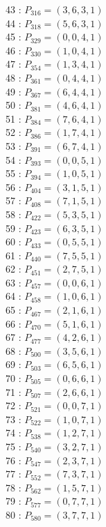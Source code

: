 \documentclass{article}
\begin{document}
{\begin{multicols}{3}
43 : $P_{316}=( 3, 6, 3, 1 )$\\
44 : $P_{318}=( 5, 6, 3, 1 )$\\
45 : $P_{329}=( 0, 0, 4, 1 )$\\
46 : $P_{330}=( 1, 0, 4, 1 )$\\
47 : $P_{354}=( 1, 3, 4, 1 )$\\
48 : $P_{361}=( 0, 4, 4, 1 )$\\
49 : $P_{367}=( 6, 4, 4, 1 )$\\
50 : $P_{381}=( 4, 6, 4, 1 )$\\
51 : $P_{384}=( 7, 6, 4, 1 )$\\
52 : $P_{386}=( 1, 7, 4, 1 )$\\
53 : $P_{391}=( 6, 7, 4, 1 )$\\
54 : $P_{393}=( 0, 0, 5, 1 )$\\
55 : $P_{394}=( 1, 0, 5, 1 )$\\
56 : $P_{404}=( 3, 1, 5, 1 )$\\
57 : $P_{408}=( 7, 1, 5, 1 )$\\
58 : $P_{422}=( 5, 3, 5, 1 )$\\
59 : $P_{423}=( 6, 3, 5, 1 )$\\
60 : $P_{433}=( 0, 5, 5, 1 )$\\
61 : $P_{440}=( 7, 5, 5, 1 )$\\
62 : $P_{451}=( 2, 7, 5, 1 )$\\
63 : $P_{457}=( 0, 0, 6, 1 )$\\
64 : $P_{458}=( 1, 0, 6, 1 )$\\
65 : $P_{467}=( 2, 1, 6, 1 )$\\
66 : $P_{470}=( 5, 1, 6, 1 )$\\
67 : $P_{477}=( 4, 2, 6, 1 )$\\
68 : $P_{500}=( 3, 5, 6, 1 )$\\
69 : $P_{503}=( 6, 5, 6, 1 )$\\
70 : $P_{505}=( 0, 6, 6, 1 )$\\
71 : $P_{507}=( 2, 6, 6, 1 )$\\
72 : $P_{521}=( 0, 0, 7, 1 )$\\
73 : $P_{522}=( 1, 0, 7, 1 )$\\
74 : $P_{538}=( 1, 2, 7, 1 )$\\
75 : $P_{540}=( 3, 2, 7, 1 )$\\
76 : $P_{547}=( 2, 3, 7, 1 )$\\
77 : $P_{552}=( 7, 3, 7, 1 )$\\
78 : $P_{562}=( 1, 5, 7, 1 )$\\
79 : $P_{577}=( 0, 7, 7, 1 )$\\
80 : $P_{580}=( 3, 7, 7, 1 )$\\
\end{multicols}


}
\end{document}
